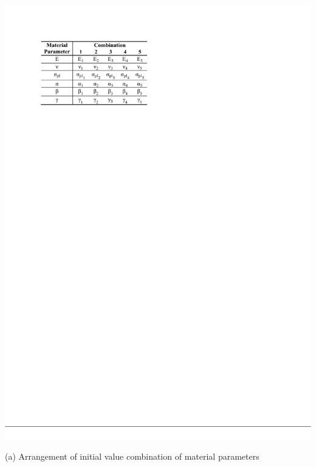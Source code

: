     \begin{table}[H]
        \centering
        \begin{minipage}[T!]{1.0\textwidth}
            \centering
            \begin{minipage}[T!][5.3cm][T!]{0.43\textwidth}
                \includegraphics[width=1.0\textwidth]{initalValueComb.pdf}
                \vfill{}
		        \caption*{(a) Arrangement of initial value combination of material parameters}
                \label{tab:initialValueComb}
            \end{minipage}
            \hspace{0.05\textwidth} %
            \begin{minipage}[T!][5.3cm][T!]{0.43\textwidth}

\end{minipage}
\end{minipage}
\end{table}
